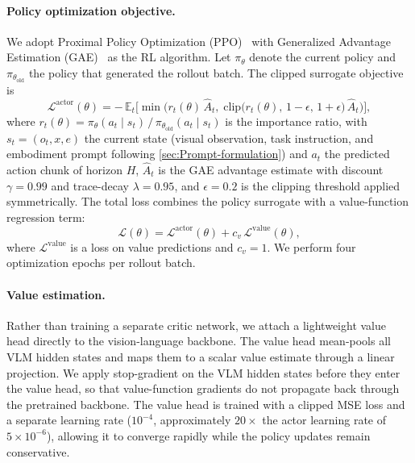 \documentclass{article}
\begin{document}
\paragraph{Policy optimization objective.}
We adopt Proximal Policy Optimization (PPO)~\citep{ppo} with Generalized Advantage Estimation (GAE)~\citep{schulman2015high} as the RL algorithm.
Let $\pi_\theta$ denote the current policy and $\pi_{\theta_\text{old}}$ the policy that generated the rollout batch.
The clipped surrogate objective is
\begin{equation}
\label{eq:ppo}
\mathcal{L}^\text{actor}(\theta) = -\,\mathbb{E}_{t}\Big[\min\!\Big(
    r_t(\theta)\,\hat{A}_t,\;
    \text{clip}\!\big(r_t(\theta),\,1{-}\epsilon,\,1{+}\epsilon\big)\,\hat{A}_t
\Big)\Big],
\end{equation}
where $r_t(\theta) = \pi_\theta(a_t \mid s_t)\,/\,\pi_{\theta_\text{old}}(a_t \mid s_t)$ is the importance ratio, with $s_t = (o_t, x, e)$ the current state (visual observation, task instruction, and embodiment prompt following \cref{sec:Prompt-formulation}) and $a_t$ the predicted action chunk of horizon $H$, $\hat{A}_t$ is the GAE advantage estimate with discount $\gamma{=}0.99$ and trace-decay $\lambda{=}0.95$, and $\epsilon{=}0.2$ is the clipping threshold applied symmetrically.
The total loss combines the policy surrogate with a value-function regression term:
\begin{equation}
\label{eq:ppo-total}
\mathcal{L}(\theta) = \mathcal{L}^\text{actor}(\theta) + c_v\,\mathcal{L}^\text{value}(\theta),
\end{equation}
where $\mathcal{L}^\text{value}$ is a loss on value predictions and $c_v{=}1$.
We perform four optimization epochs per rollout batch.



\paragraph{Value estimation.}
Rather than training a separate critic network, we attach a lightweight value head directly to the vision-language backbone.
The value head mean-pools all VLM hidden states and maps them to a scalar value estimate through a linear projection.
We apply stop-gradient on the VLM hidden states before they enter the value head, so that value-function gradients do not propagate back through the pretrained backbone.
The value head is trained with a clipped MSE loss and a separate learning rate ($10^{-4}$, approximately $20\times$ the actor learning rate of $5{\times}10^{-6}$), allowing it to converge rapidly while the policy updates remain conservative.
\end{document}
